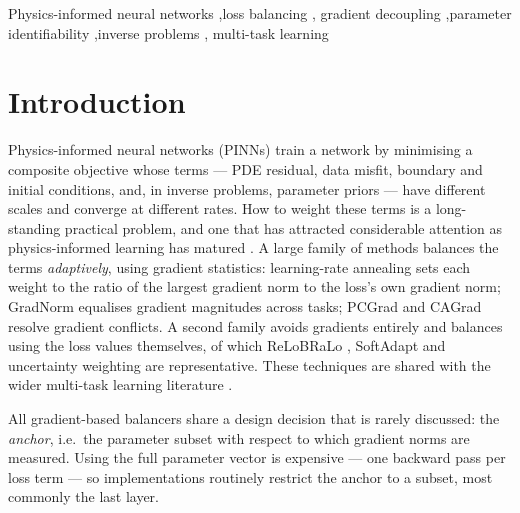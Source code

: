 \documentclass[a4paper,fleqn]{cas-sc}
\begin{document}

\begin{keywords}
Physics-informed neural networks \sep loss balancing \sep
gradient decoupling \sep parameter identifiability \sep inverse problems \sep
multi-task learning
\end{keywords}

\maketitle

\section{Introduction}
\label{sec:intro}

Physics-informed neural networks (PINNs) \citep{raissi2019physics,sirignano2018dgm}
train a network by minimising a composite objective whose terms --- PDE
residual, data misfit, boundary and initial conditions, and, in inverse
problems, parameter priors --- have different scales and converge at different
rates. How to weight these terms is a long-standing practical problem, and one
that has attracted considerable attention as physics-informed learning has
matured \citep{karniadakis2021physics,cuomo2022scientific,blechschmidt2021three}.
A large family of methods balances the terms \emph{adaptively}, using gradient
statistics: learning-rate annealing \citep{wang2021understanding} sets each
weight to the ratio of the largest gradient norm to the loss's own gradient
norm; GradNorm \citep{chen2018gradnorm} equalises gradient magnitudes across
tasks; PCGrad \citep{yu2020gradient} and CAGrad \citep{liu2021conflict} resolve
gradient conflicts. A second family avoids gradients entirely and balances
using the loss values themselves, of which ReLoBRaLo \citep{bischof2021multi},
SoftAdapt \citep{heydari2019softadapt} and uncertainty weighting
\citep{kendall2018multi} are representative. These techniques are shared with
the wider multi-task learning literature
\citep{ruder2017overview,crawshaw2020multi}.

All gradient-based balancers share a design decision that is rarely discussed:
the \emph{anchor}, i.e.\ the parameter subset with respect to which gradient
norms are measured. Using the full parameter vector is expensive --- one
backward pass per loss term --- so implementations routinely restrict the
anchor to a subset, most commonly the last layer.
\end{document}
